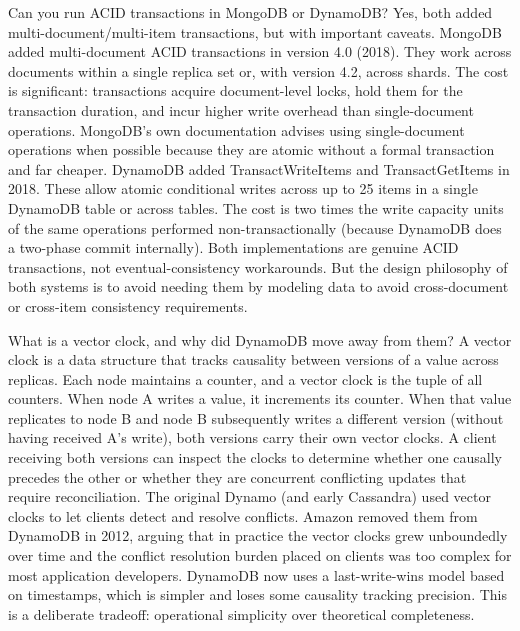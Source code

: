 \documentclass[11pt,a4paper]{article}
\begin{document}
\begin{curiobox}{Can you run ACID transactions in MongoDB or DynamoDB?}
Yes, both added multi-document/multi-item transactions, but with important caveats. MongoDB added multi-document ACID transactions in version 4.0 (2018). They work across documents within a single replica set or, with version 4.2, across shards. The cost is significant: transactions acquire document-level locks, hold them for the transaction duration, and incur higher write overhead than single-document operations. MongoDB's own documentation advises using single-document operations when possible because they are atomic without a formal transaction and far cheaper. DynamoDB added TransactWriteItems and TransactGetItems in 2018. These allow atomic conditional writes across up to 25 items in a single DynamoDB table or across tables. The cost is two times the write capacity units of the same operations performed non-transactionally (because DynamoDB does a two-phase commit internally). Both implementations are genuine ACID transactions, not eventual-consistency workarounds. But the design philosophy of both systems is to avoid needing them by modeling data to avoid cross-document or cross-item consistency requirements.
\end{curiobox}

\begin{curiobox}{What is a vector clock, and why did DynamoDB move away from them?}
A vector clock is a data structure that tracks causality between versions of a value across replicas. Each node maintains a counter, and a vector clock is the tuple of all counters. When node A writes a value, it increments its counter. When that value replicates to node B and node B subsequently writes a different version (without having received A's write), both versions carry their own vector clocks. A client receiving both versions can inspect the clocks to determine whether one causally precedes the other or whether they are concurrent conflicting updates that require reconciliation. The original Dynamo (and early Cassandra) used vector clocks to let clients detect and resolve conflicts. Amazon removed them from DynamoDB in 2012, arguing that in practice the vector clocks grew unboundedly over time and the conflict resolution burden placed on clients was too complex for most application developers. DynamoDB now uses a last-write-wins model based on timestamps, which is simpler and loses some causality tracking precision. This is a deliberate tradeoff: operational simplicity over theoretical completeness.
\end{curiobox}
\end{document}
